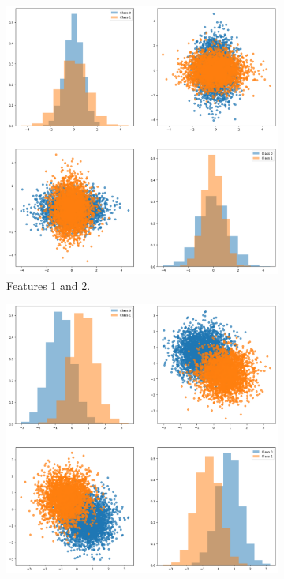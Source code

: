 \documentclass{article}
\begin{document}
\begin{figure}[ht]
    \centering
    \begin{subfigure}[b]{0.3\textwidth}
        \centering
        \includegraphics[width=\textwidth]{images/dataset_12.png}
        \caption{Features 1 and 2.}
    \end{subfigure}
    \hfill
    \begin{subfigure}[b]{0.3\textwidth}
        \centering
        \includegraphics[width=\textwidth]{images/dataset_34.png}

\end{subfigure}
\end{figure}
\end{document}
